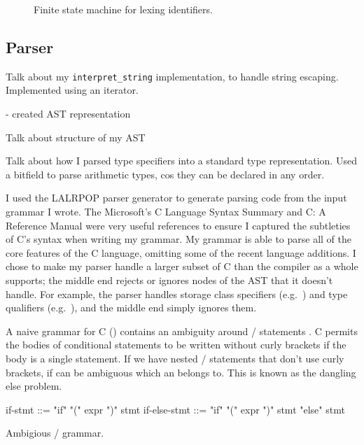 \documentclass[00-main.tex]{subfiles}
\begin{document}
\begin{figure}[ht]
  \centering
  \caption{Finite state machine for lexing identifiers.}
  \label{fig:lexing identifiers fsm}
\end{figure}


\subsection{Parser}

\begin{Comment}
Talk about my \texttt{interpret\_string} implementation, to handle string escaping. Implemented using an iterator.

- created AST representation

Talk about structure of my AST

Talk about how I parsed type specifiers into a standard type representation. Used a bitfield to parse arithmetic types, cos they can be declared in any order.
\end{Comment}

I used the LALRPOP parser generator  to generate parsing code from the input grammar I wrote.
The Microsoft's C Language Syntax Summary  and C: A Reference Manual  were very useful references to ensure I captured the subtleties of C's syntax when writing my grammar.
My grammar is able to parse all of the core features of the C language, omitting some of the recent language additions. I chose to make my parser handle a larger subset of C than the compiler as a whole supports; the middle end rejects or ignores nodes of the AST that it doesn't handle. For example, the parser handles storage class specifiers (e.g.\ ) and type qualifiers (e.g.\ ), and the middle end simply ignores them.

A naive grammar for C () contains an ambiguity around / statements .
C permits the bodies of conditional statements to be written without curly brackets if the body is a single statement.
If we have nested / statements that don't use curly brackets, if can be ambiguous which  an  belongs to. This is known as the dangling else problem.

\begin{listing}[!ht]
  \begin{GrammarListing}
    if-stmt      ::= "if" "(" expr ")" stmt
    if-else-stmt ::= "if" "(" expr ")" stmt "else" stmt
  \end{GrammarListing}
  \caption{Ambigious / grammar.}
  \label{lst:ambiguous if-else grammar}
\end{listing}
\end{document}
